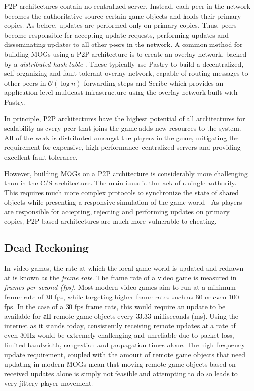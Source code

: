 P2P architectures contain no centralized server. Instead, each peer in the network becomes the authoritative source certain game objects and holds their primary copies. As before, updates are performed only on primary copies. Thus, peers become responsible for accepting update requests, performing updates and disseminating updates to all other peers in the network. A common method for building MOGs using a P2P architecture is to create an overlay network, backed by a \textit{distributed hash table} \cite{p2p-mog-dht}. These typically use Pastry to build a decentralized, self-organizing and fault-tolerant overlay network, capable of routing messages to other peers in $\mathcal{O}(\log{}n)$ forwarding steps \cite{pastry} and Scribe \cite{scribe} which provides an application-level multicast infrastructure using the overlay network built with Pastry.

In principle, P2P architectures have the highest potential of all architectures for scalability as every peer that joins the game adds new resources to the system. All of the work is distributed amongst the players in the game, mitigating the requirement for expensive, high performance, centralized servers and providing excellent fault tolerance. 

However, building MOGs on a P2P architecture is considerably more challenging than in the C/S architecture. The main issue is the lack of a single authority. This requires much more complex protocols to synchronize the state of shared objects while presenting a responsive simulation of the game world \cite{dead-reckoning}. As players are responsible for accepting, rejecting and performing updates on primary copies, P2P based architectures are much more vulnerable to cheating. 

\subsection{Dead Reckoning}\label{sec:dead-reckoning}
In video games, the rate at which the local game world is updated and redrawn at is known as the \textit{frame rate}. The frame rate of a video game is measured in \textit{frames per second (fps)}. Most modern video games aim to run at a minimum frame rate of 30 fps, while targeting higher frame rates such as 60 or even 100 fps. In the case of a 30 fps frame rate, this would require an update to be available for \textbf{all} remote game objects every 33.33 milliseconds (ms). Using the internet as it stands today, consistently receiving remote updates at a rate of even 30Hz would be extremely challenging and unreliable due to packet loss, limited bandwidth, congestion and propagation times alone. The high frequency update requirement, coupled with the amount of remote game objects that need updating in modern MOGs mean that moving remote game objects based on received updates alone is simply not feasible and attempting to do so leads to very jittery player movement.

